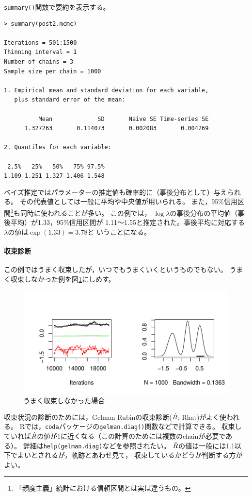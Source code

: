\documentclass[11pt,uplatex]{jsarticle}
\begin{document}
\texttt{summary()}関数で要約を表示する。
\begin{lstlisting}
> summary(post2.mcmc)

Iterations = 501:1500
Thinning interval = 1 
Number of chains = 3 
Sample size per chain = 1000 

1. Empirical mean and standard deviation for each variable,
   plus standard error of the mean:

          Mean             SD       Naive SE Time-series SE 
      1.327263       0.114073       0.002083       0.004269 

2. Quantiles for each variable:

 2.5%   25%   50%   75% 97.5% 
1.109 1.251 1.327 1.406 1.548 

\end{lstlisting}
%
ベイズ推定ではパラメーターの推定値も確率的に（事後分布として）与えられる。
その代表値としては一般に平均や中央値が用いられる。
また，95\%信用区間\footnote{「頻度主義」統計における信頼区間とは実は違うもの。}も同時に使われることが多い。
この例では，
$\log\lambda$の事後分布の平均値（事後平均）が1.33，95\%信用区間が
1.11〜1.55と推定された。事後平均に対応する$\lambda$の値は$\exp(1.33)=3.78$と
いうことになる。

\paragraph{収束診断}
この例ではうまく収束したが，いつでもうまくいくというものでもない。
うまく収束しなかった例を図\ref{bad_mcmc}にしめす。
\begin{figure}[htbp]
	\begin{center}
		\includegraphics[bb=0 0 420 210, clip, width=320 bp]{bad_mcmc.pdf}
	\end{center}
	\caption{うまく収束しなかった場合}
	\label{bad_mcmc}
\end{figure}

収束状況の診断のためには，Gelman-Rubinの収束診断($\Hat{R}$; Rhat)がよく使われる。
\textsf{R}では，\texttt{coda}パッケージの\texttt{gelman.diag()}関数などで計算できる。
収束していれば$\Hat{R}$の値が1に近くなる（この計算のためには複数のchainが必要である）。
詳細は\texttt{help(gelman.diag)}などを参照されたい。
$\Hat{R}$の値は一般には1.1以下でよいとされるが，軌跡とあわせ見て，
収束しているかどうか判断する方がよい。
\end{document}
